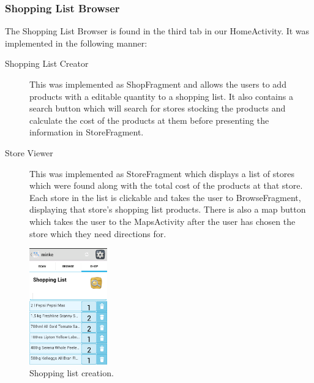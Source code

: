 \subsubsection{Shopping List Browser}
The Shopping List Browser is found in the third tab in our HomeActivity. It was
implemented in the following manner:
\begin{description}
\item[Shopping List Creator] This was implemented as ShopFragment and allows the
users to add products with a editable quantity to a shopping list. It also
contains a search button which will search for stores stocking the products and
calculate the cost of the products at them before presenting the information in
StoreFragment. 
\item[Store Viewer] This was implemented as StoreFragment which displays a
list of stores which were found along with the total cost of the products at
that store. Each store in the list is clickable and takes the user to
BrowseFragment, displaying that store's shopping list products. There is also a
map button which takes the user to the MapsActivity after the user has chosen
the store which they need directions for.
\end{description}
\begin{figure}[h!]
\centering
\includegraphics[width=0.3\textwidth]{shop-list.png}
\caption{Shopping list creation.}
\end{figure}
